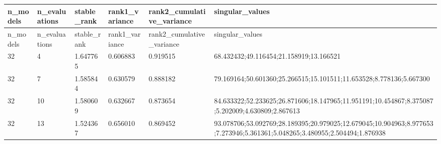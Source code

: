 \begin{longtable}{llllll}
n\_models & n\_evaluations & stable\_rank & rank1\_variance & rank2\_cumulative\_variance & singular\_values \\
\hline
\endfirsthead
n\_models & n\_evaluations & stable\_rank & rank1\_variance & rank2\_cumulative\_variance & singular\_values \\
\hline
\endhead
32 & 4 & 1.647765 & 0.606883 & 0.919515 & 68.432432;49.116454;21.158919;13.166521 \\
32 & 7 & 1.585844 & 0.630579 & 0.888182 & 79.169164;50.601360;25.266515;15.101511;11.653528;8.778136;5.667300 \\
32 & 10 & 1.580609 & 0.632667 & 0.873654 & 84.633322;52.233625;26.871606;18.147965;11.951191;10.454867;8.375087;5.202009;4.630809;2.867613 \\
32 & 13 & 1.524367 & 0.656010 & 0.869452 & 93.078706;53.092769;28.189395;20.979025;12.679045;10.904963;8.977653;7.273946;5.361361;5.048265;3.480955;2.504494;1.876938 \\
\end{longtable}
